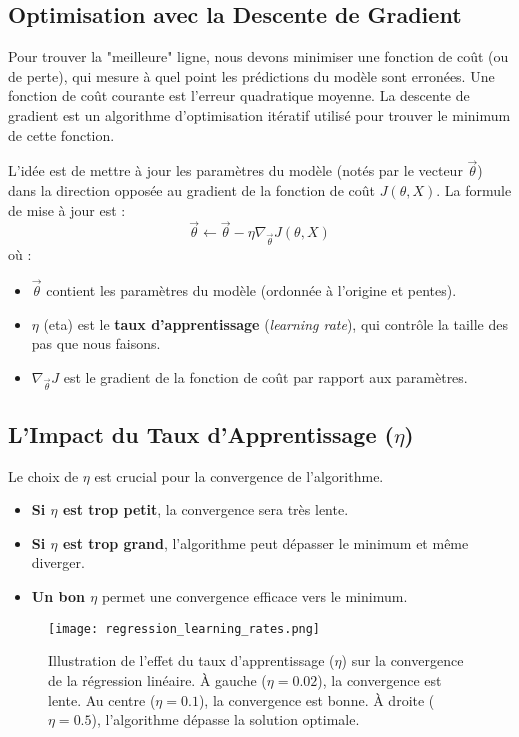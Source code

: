 \documentclass[12pt]{article}
\begin{document}
\subsection{Optimisation avec la Descente de Gradient}
Pour trouver la "meilleure" ligne, nous devons minimiser une fonction de coût (ou de perte), qui mesure à quel point les prédictions du modèle sont erronées. Une fonction de coût courante est l'erreur quadratique moyenne. La descente de gradient est un algorithme d'optimisation itératif utilisé pour trouver le minimum de cette fonction.

L'idée est de mettre à jour les paramètres du modèle (notés par le vecteur $\vec{\theta}$) dans la direction opposée au gradient de la fonction de coût $J(\theta, X)$. La formule de mise à jour est :
\begin{equation}
\vec{\theta} \leftarrow \vec{\theta} - \eta \nabla_{\vec{\theta}} J(\theta, X)
\end{equation}
où :
\begin{itemize}
    \item $\vec{\theta}$ contient les paramètres du modèle (ordonnée à l'origine et pentes).
    \item $\eta$ (eta) est le \textbf{taux d'apprentissage} (\textit{learning rate}), qui contrôle la taille des pas que nous faisons.
    \item $\nabla_{\vec{\theta}} J$ est le gradient de la fonction de coût par rapport aux paramètres.
\end{itemize}

\subsection{L'Impact du Taux d'Apprentissage ($\eta$)}
Le choix de $\eta$ est crucial pour la convergence de l'algorithme.
\begin{itemize}
    \item \textbf{Si $\eta$ est trop petit}, la convergence sera très lente.
    \item \textbf{Si $\eta$ est trop grand}, l'algorithme peut dépasser le minimum et même diverger.
    \item \textbf{Un bon $\eta$} permet une convergence efficace vers le minimum.
\end{itemize}

\begin{figure}[h!]
    \centering
    \texttt{[image: regression\_learning\_rates.png]}
    \caption{Illustration de l'effet du taux d'apprentissage ($\eta$) sur la convergence de la régression linéaire. À gauche ($\eta=0.02$), la convergence est lente. Au centre ($\eta=0.1$), la convergence est bonne. À droite ($\eta=0.5$), l'algorithme dépasse la solution optimale.}
    \label{fig:learning_rates}
\end{figure}
\end{document}
